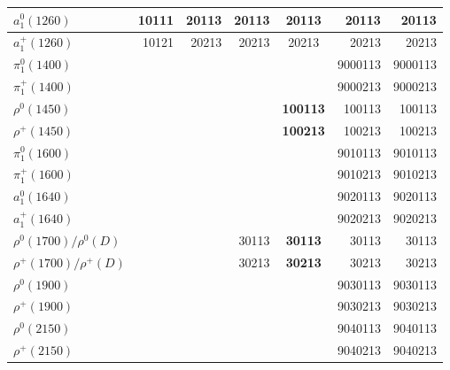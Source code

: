 \begin{tabular}{|l@{\tstrut}|r|r|r|c|r|r|}
$a_1^0(1260)$            & 10111 & 20113 &   20113 & 20113 &    20113 & 20113 \\ \hline
$a_1^+(1260)$            & 10121 & 20213 &   20213 & 20213 &    20213 & 20213 \\ \hline
$\pi_1^0(1400)$          &       &       &         &       &  9000113 & 9000113 \\ \hline
$\pi_1^+(1400)$          &       &       &         &       &  9000213 & 9000213 \\ \hline
$\rho^0(1450)$           &       &       &         & \bf{100113} &   100113 & 100113 \\ \hline
$\rho^+(1450)$           &       &       &         & \bf{100213} &   100213 & 100213 \\ \hline
$\pi_1^0(1600)$          &       &       &         &       &  9010113 & 9010113 \\ \hline
$\pi_1^+(1600)$          &       &       &         &       &  9010213 & 9010213 \\ \hline
$a_1^0(1640)$            &       &       &         &       &  9020113 & 9020113 \\ \hline
$a_1^+(1640)$            &       &       &         &       &  9020213 & 9020213 \\ \hline
$\rho^0(1700)/\rho^0(D)$ &       &       &   30113 & \bf{30113} &    30113 & 30113 \\ \hline
$\rho^+(1700)/\rho^+(D)$ &       &       &   30213 & \bf{30213} &    30213 & 30213 \\ \hline
$\rho^0(1900)$           &       &       &         &       &  9030113 & 9030113 \\ \hline
$\rho^+(1900)$           &       &       &         &       &  9030213 & 9030213 \\ \hline
$\rho^0(2150)$           &       &       &         &       &  9040113 & 9040113 \\ \hline
$\rho^+(2150)$           &       &       &         &       &  9040213 & 9040213 \\ \hline
\end{tabular}

